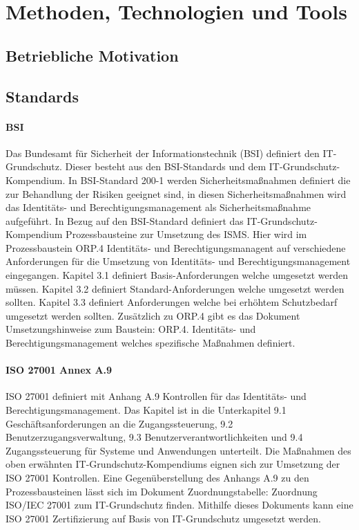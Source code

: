 \documentclass[12pt]{article}
\begin{document}
\section{Methoden, Technologien und Tools}
\label{sec:existing}
\subsection{Betriebliche Motivation}
\subsection{Standards}
\paragraph{BSI}
Das Bundesamt für Sicherheit der Informationstechnik (BSI) definiert den IT-Grundschutz. Dieser besteht aus den BSI-Standards und dem IT-Grundschutz-Kompendium. In BSI-Standard 200-1 werden Sicherheitsmaßnahmen definiert die zur Behandlung der Risiken geeignet sind, in diesen Sicherheitsmaßnahmen wird das Identitäts- und Berechtigungsmanagement als Sicherheitsmaßnahme aufgeführt. In Bezug auf den BSI-Standard definiert das IT-Grundschutz-Kompendium Prozessbausteine zur Umsetzung des ISMS. Hier wird im Prozessbaustein \glqq{}ORP.4 Identitäts- und Berechtigungsmanagent\grqq{} auf verschiedene Anforderungen für die Umsetzung von Identitäts- und Berechtigungsmanagement eingegangen. Kapitel 3.1 definiert Basis-Anforderungen welche umgesetzt werden müssen. Kapitel 3.2 definiert Standard-Anforderungen welche umgesetzt werden sollten. Kapitel 3.3 definiert Anforderungen welche bei erhöhtem Schutzbedarf umgesetzt werden sollten. Zusätzlich zu ORP.4 gibt es das Dokument \glqq{}Umsetzungshinweise zum Baustein: ORP.4. Identitäts- und Berechtigungsmanagement\grqq{} welches spezifische Maßnahmen definiert.~\cite{orp4}
\paragraph{ISO 27001 Annex A.9}
ISO 27001 definiert mit Anhang A.9 Kontrollen für das Identitäts- und Berechtigungsmanagement. Das Kapitel ist in die Unterkapitel \glqq{}9.1 Geschäftsanforderungen an die Zugangssteuerung\grqq{}, \glqq{}9.2 Benutzerzugangsverwaltung\grqq{}, \glqq{}9.3 Benutzerverantwortlichkeiten\grqq{} und \glqq{}9.4 Zugangssteuerung für Systeme und Anwendungen\grqq{} unterteilt. Die Maßnahmen des oben erwähnten IT-Grundschutz-Kompendiums eignen sich zur Umsetzung der ISO 27001 Kontrollen. Eine Gegenüberstellung des Anhangs A.9 zu den Prozessbausteinen lässt sich im Dokument \glqq{}Zuordnungstabelle: Zuordnung ISO/IEC 27001 zum IT-Grundschutz\grqq{} finden. Mithilfe dieses Dokuments kann eine ISO 27001 Zertifizierung auf Basis von IT-Grundschutz umgesetzt werden.~\cite{bsi2023basis}
\end{document}
